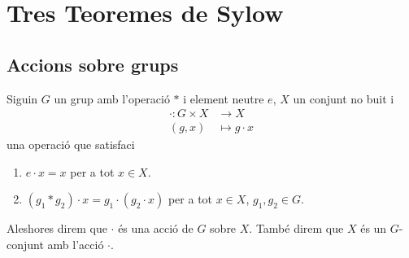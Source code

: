 \documentclass[../Apunts.tex]{subfiles}
\begin{document}
	\section{Tres Teoremes de Sylow}
	\subsection{Accions sobre grups}
	\begin{definition}
		\label{def:acció d'un grup sobre un conjunt}
		Siguin \(G\) un grup amb l'operació \(\ast\) i element neutre \(e\), \(X\) un conjunt no buit i
		\begin{align*}
		\cdot\colon G\times X&\longrightarrow X\\
		(g,x)&\longmapsto g\cdot x
		\end{align*}
		una operació que satisfaci
		\begin{enumerate}
			\item \(e\cdot x=x\) per a tot \(x\in X\).
			\item \((g_{1}\ast g_{2})\cdot x=g_{1}\cdot(g_{2}\cdot x)\) per a tot \(x\in X\), \(g_{1},g_{2}\in G\).
		\end{enumerate}
		Aleshores direm que \(\cdot\) és una acció de \(G\) sobre \(X\). També direm que \(X\) és un \(G\)-conjunt amb l'acció \(\cdot\).
	\end{definition}
\end{document}
